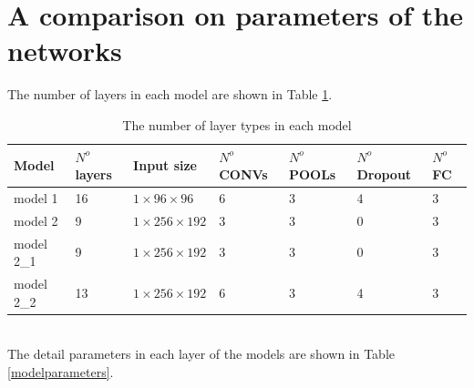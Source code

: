 \documentclass[12pt,a4paper]{article}
\begin{document}
\section*{A comparison on parameters of the networks}
The number of layers in each model are shown in Table \ref{numlayers}.
\begin{table}[h!]
	\centering
	\begin{tabular}{l p{1.2cm} p{3cm} p{2cm} p{1.2cm} p{2cm} p{2cm}}
		Model & $N^o$ layers & Input size & $N^o$ CONVs & $N^o$ POOLs & $N^o$ Dropout & $N^o$ FC \\ \hline
		model 1 & 16 & $1 \times 96 \times 96$ & 6 & 3 & 4 & 3 \\ \hline
		model 2 & 9 & $1 \times 256 \times 192$ & 3 & 3 & 0 & 3 \\ \hline
		model 2\_1 & 9 & $1 \times 256 \times 192$ & 3 & 3 & 0 & 3 \\ \hline
		model 2\_2 & 13 & $1 \times 256 \times 192$ & 6 & 3 & 4 & 3 \\ \hline
	\end{tabular}
	\caption{The number of layer types in each model}
	\label{numlayers}
\end{table}~\\
The detail parameters in each layer of the models are shown in Table \ref{modelparameters}.
\end{document}
